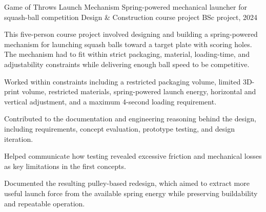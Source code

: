 \projectseparator

\projectentry
  {Game of Throws Launch Mechanism}
  {Spring-powered mechanical launcher for squash-ball competition}
  {Design \& Construction course project}
  {BSc project, 2024}
  {    }
  {\catapultfigure}
  {This five-person course project involved designing and building a spring-powered mechanism for launching squash balls toward a target plate with scoring holes. The mechanism had to fit within strict packaging, material, loading-time, and adjustability constraints while delivering enough ball speed to be competitive.

  \begin{projectbullets}
    \item Worked within constraints including a restricted packaging volume, limited 3D-print volume, restricted materials, spring-powered launch energy, horizontal and vertical adjustment, and a maximum 4-second loading requirement.
    \item Contributed to the documentation and engineering reasoning behind the design, including requirements, concept evaluation, prototype testing, and design iteration.
    \item Helped communicate how testing revealed excessive friction and mechanical losses as key limitations in the first concepts.
    \item Documented the resulting pulley-based redesign, which aimed to extract more useful launch force from the available spring energy while preserving buildability and repeatable operation.
  \end{projectbullets}}
